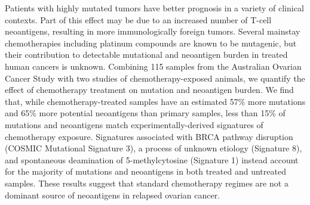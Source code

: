 Patients with highly mutated tumors have better prognosis in a variety of clinical contexts. Part of this effect may be due to an increased number of T-cell neoantigens, resulting in more immunologically foreign tumors. Several mainstay chemotherapies including platinum compounds are known to be mutagenic, but their contribution to detectable mutational and neoantigen burden in treated human cancers is unknown. Combining 115 samples from the Australian Ovarian Cancer Study with two studies of chemotherapy-exposed animals, we quantify the effect of chemotherapy treatment on mutation and neoantigen burden. We find that, while chemotherapy-treated samples have an estimated 57\% more mutations and 65\% more potential neoantigens than primary samples, less than 15\% of mutations and neoantigens match experimentally-derived signatures of chemotherapy exposure. Signatures associated with BRCA pathway disruption (COSMIC Mutational Signature 3), a process of unknown etiology (Signature 8), and spontaneous deamination of 5-methylcytosine (Signature 1) instead account for the majority of mutations and neoantigens in both treated and untreated samples. These results suggest that standard chemotherapy regimes are not a dominant source of neoantigens in relapsed ovarian cancer.

